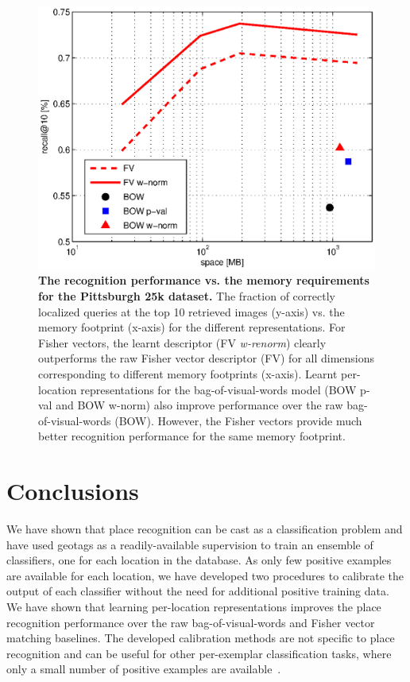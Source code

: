     \begin{figure}[t!]
        \centering
        \includegraphics[width=1.1\linewidth]{imgs/FVmemory02}    
        \caption{
            \textbf{The recognition performance vs. the memory requirements for the Pittsburgh 25k dataset.} 
            The fraction of correctly localized queries at the top 10 retrieved images (y-axis) vs. the memory footprint (x-axis) for the different representations. For Fisher vectors, the learnt descriptor (FV \emph{w-renorm}) clearly outperforms the raw Fisher vector descriptor (FV) for all dimensions corresponding to different memory footprints (x-axis). 
            Learnt per-location representations for the bag-of-visual-words model (BOW p-val and BOW w-norm) also improve performance over the raw bag-of-visual-words (BOW). However, the Fisher vectors provide much better recognition performance for the same memory footprint.  
        }
        \label{fig:memory}
    \end{figure}


\section{Conclusions}
We have shown that place recognition can be cast as a classification problem and have used geotags as a readily-available supervision to
train an ensemble of classifiers, one for each location in the database. As only few positive examples are available for each
location, we have developed two procedures to calibrate the output of each classifier without the need for additional positive training
data. We have shown that learning per-location representations improves the place recognition performance over the raw bag-of-visual-words and
Fisher vector matching baselines. The developed calibration methods are not specific to place recognition and can be useful for other
per-exemplar classification tasks, where only a small number of positive examples are available~\cite{Malisiewicz11}.



